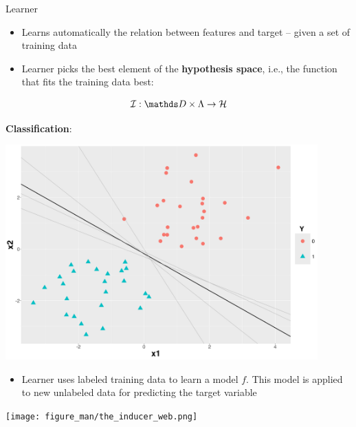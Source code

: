 \documentclass[11pt,compress,t,notes=noshow, xcolor=table]{beamer}
\begin{document}
\begin{vbframe}{Learner}

\begin{itemize}

\item Learns automatically the relation between features and target -- given a set of training data
\item Learner picks the best element of the \textbf{hypothesis space}, i.e., the function that fits the training data best:
\end{itemize} 
\[\ind: \preimageInducerShort \rightarrow \Hspace\]

{
\textbf{Classification}:

\vspace{1em}

\includegraphics[width=0.9\textwidth]{figure/nutshell-ml-basics-hypothesisspace-classif.png}
}
\newpage

\begin{itemize}
\item Learner uses labeled training data to learn a model $f$. This model is applied to new unlabeled data for predicting the target variable
\end{itemize}

 \begin{center}
    \texttt{[image: figure\_man/the\_inducer\_web.png]}
  \end{center}

\end{vbframe}
\end{document}
